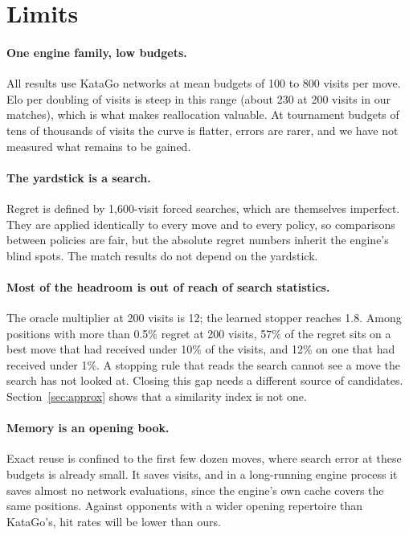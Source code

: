 \section{Limits}
\label{sec:limits}

\paragraph{One engine family, low budgets.}
All results use KataGo networks at mean budgets of 100 to 800 visits per move. Elo per doubling of visits is steep in this range (about 230 at 200 visits in our matches), which is what makes reallocation valuable. At tournament budgets of tens of thousands of visits the curve is flatter, errors are rarer, and we have not measured what remains to be gained.

\paragraph{The yardstick is a search.}
Regret is defined by 1{,}600-visit forced searches, which are themselves imperfect. They are applied identically to every move and to every policy, so comparisons between policies are fair, but the absolute regret numbers inherit the engine's blind spots. The match results do not depend on the yardstick.

\paragraph{Most of the headroom is out of reach of search statistics.}
The oracle multiplier at 200 visits is 12; the learned stopper reaches 1.8. Among positions with more than 0.5\% regret at 200 visits, 57\% of the regret sits on a best move that had received under 10\% of the visits, and 12\% on one that had received under 1\%. A stopping rule that reads the search cannot see a move the search has not looked at. Closing this gap needs a different source of candidates. Section~\ref{sec:approx} shows that a similarity index is not one.

\paragraph{Memory is an opening book.}
Exact reuse is confined to the first few dozen moves, where search error at these budgets is already small. It saves visits, and in a long-running engine process it saves almost no network evaluations, since the engine's own cache covers the same positions. Against opponents with a wider opening repertoire than KataGo's, hit rates will be lower than ours.

